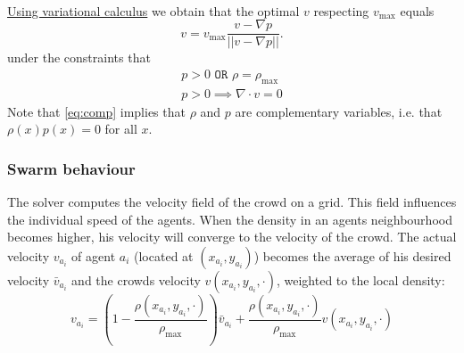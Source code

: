 \documentclass{article}
\begin{document}
\ \\
\underline{Using variational calculus} we obtain that the optimal $v$ respecting $v_{\max}$ equals $$v = v_{\max}\frac{v-\nabla p}{||v-\nabla p||}.$$
under the constraints that 
\begin{align}
\label{eq:comp}
p>0 \texttt{ OR } \rho=\rho_{\max}\\
p>0 \implies \nabla\cdot v=0
\end{align}
Note that \eqref{eq:comp} implies that $\rho$ and $p$ are complementary variables, i.e. that $\rho(x)p(x)=0$ for all $x$.
\subsubsection{Swarm behaviour}
The solver computes the velocity field of the crowd on a grid. This field influences the individual speed of the agents. When the density in an agents neighbourhood becomes higher, his velocity will converge to the velocity of the crowd. The actual velocity $v_{a_i}$ of agent $a_i$ (located at $(x_{a_i},y_{a_i})$) becomes the average of his desired velocity $\bar{v}_{a_i}$ and the crowds velocity $v(x_{a_i},y_{a_i},\cdot)$, weighted to the local density:
\begin{equation}
	v_{a_i} = \left(1-\frac{\rho(x_{a_i},y_{a_i},\cdot)}{\rho_{\max}}\right)\bar{v}_{a_i}+\frac{\rho(x_{a_i},y_{a_i},\cdot)}{\rho_{\max}}v(x_{a_i},y_{a_i},\cdot)
	\label{eq:dens_velo}
\end{equation}
\end{document}

